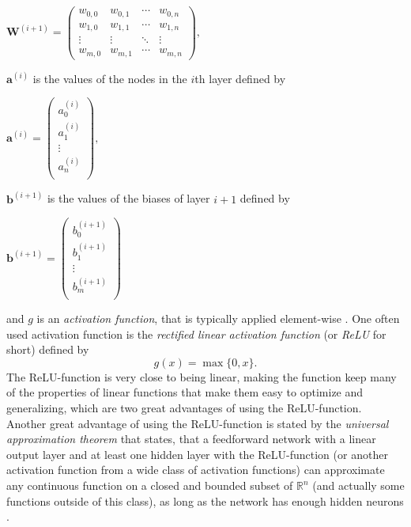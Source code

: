 \documentclass[./main.tex]{subfiles}
\begin{document}
\begin{center}
    \begin{math}
        \bm{W}^{(i + 1)} =
        \begin{pmatrix}
            w_{0, 0} & w_{0, 1} & \cdots & w_{0, n} \\
            w_{1, 0} & w_{1, 1} & \cdots & w_{1, n} \\
            \vdots & \vdots & \ddots & \vdots \\
            w_{m, 0} & w_{m, 1} & \cdots & w_{m, n}
        \end{pmatrix}
        ,
    \end{math}
\end{center}
$\bm{a}^{(i)}$ is the values of the nodes in the $i$th layer defined by
\begin{center}
    \begin{math}
        \bm{a}^{(i)} =
        \begin{pmatrix}
            a_{0} ^{(i)} \\
            a_{1} ^{(i)} \\
            \vdots \\
            a_{n} ^{(i)} \\
        \end{pmatrix}
        ,
    \end{math}
\end{center}
$\bm{b}^{(i + 1)}$ is the values of the biases of layer $i + 1$ defined by
\begin{center}
    \begin{math}
        \bm{b}^{(i + 1)} =
        \begin{pmatrix}
            b_{0} ^{(i + 1)} \\
            b_{1} ^{(i + 1)} \\
            \vdots \\
            b_{m} ^{(i + 1)} \\
        \end{pmatrix}
    \end{math}
\end{center}
and $g$ is an \textit{activation function}, that is typically applied element-wise \cite{DeepLearning} \cite{3b1b_1}. One often used activation function is the \textit{rectified linear activation function} (or \textit{ReLU} for short) defined by
$$g(x) = \max\{0, x\}.$$
The ReLU-function is very close to being linear, making the function keep many of the properties of linear functions that make them easy to optimize and generalizing, which are two great advantages of using the ReLU-function. Another great advantage of using the ReLU-function is stated by the \textit{universal approximation theorem} that states, that a feedforward network with a linear output layer and at least one hidden layer with the ReLU-function (or another activation function from a wide class of activation functions) can approximate any continuous function on a closed and bounded subset of $\mathbb{R}^n$ (and actually some functions outside of this class), as long as the network has enough hidden neurons \cite{DeepLearning}. 
\end{document}
